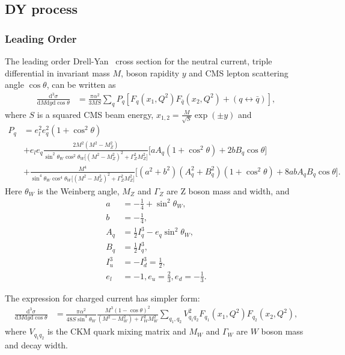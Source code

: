 \documentclass[11pt,a4paper]{article}
\begin{document}
\subsection{DY process}
\subsubsection{Leading Order}
The leading order Drell-Yan~\cite{Drell:1970wh,Yamada:1981mw} cross section 
for the neutral current, triple differential in
invariant mass \(M\), boson rapidity \(y\) and CMS
lepton scattering angle \(\cos\theta\), can be written as
\begin{align}
\frac{\mathrm{d}^3\sigma}{\mathrm{d}M\mathrm{d}y\mathrm{d}\cos\theta} &=
  \frac{\pi\alpha^2}{3MS}\sum_{q}P_q
  \left[F_q(x_1,Q^2)F_{\bar{q}}(x_2,Q^2) + (q\leftrightarrow\bar{q})\right],
\end{align}
where \(S\) is a squared CMS beam energy, \(x_{1,2} = \frac{M}{\sqrt{S}}\exp(\pm y)\) and 
\begin{align}
  P_q &=  e_l^2e_q^2(1+\cos^2\theta) \nonumber \\
      &+  e_le_q\frac{2M^2(M^2-M_Z^2)}{\sin^2\theta_W\cos^2\theta_W
          \big[(M^2-M_Z^2)^2+\Gamma_Z^2M_Z^2\big]}
          \big[aA_q(1+\cos^2\theta)+2bB_q\cos\theta\big] \nonumber \\
      &+  \frac{M^4}{\sin^4\theta_W\cos^4\theta_W
          \big[(M^2-M_Z^2)^2+\Gamma_Z^2M_Z^2\big]}
          \big[(a^2+b^2)(A_q^2+B_q^2)(1+\cos^2\theta)+8abA_qB_q\cos\theta\big].
\end{align}
Here \(\theta_W\) is the Weinberg angle, \(M_Z\) and \(\Gamma_Z\) are Z boson mass and 
width, and
\begin{align}
 a & = -\frac{1}{4} + \sin^2\theta_W,  \nonumber \\
 b & = -\frac{1}{4},  \nonumber \\
 A_q & = \frac{1}{2}I_q^3-e_q\sin^2\theta_W, \nonumber \\
 B_q & = \frac{1}{2}I_q^3,  \nonumber \\
 I_u^3 & = -I_d^3 = \frac{1}{2},  \nonumber \\
 e_l & = -1, e_u = \frac{2}{3}, e_d = -\frac{1}{3}.
\end{align}

The expression for charged current has simpler form:
\begin{align}
\frac{\mathrm{d}^3\sigma}{\mathrm{d}M\mathrm{d}y\mathrm{d}\cos\theta} &=
 \frac{\pi\alpha^2}{48S\sin^4\theta_W}
 \frac{M^3(1-\cos\theta)^2}{(M^2-M_W^2)+\Gamma_W^2M_W^2}
 \sum_{q_1,q_2}V_{q_1q_2}^2F_{q_1}(x_1,Q^2)F_{q_2}(x_2,Q^2),
\end{align}
where \(V_{q_1q_2}\) is the CKM quark mixing matrix and \(M_W\) and \(\Gamma_W\)
are \(W\) boson mass and decay width.
\end{document}
